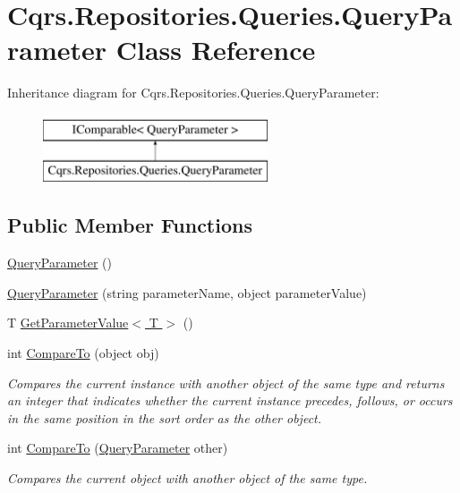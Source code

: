 \hypertarget{classCqrs_1_1Repositories_1_1Queries_1_1QueryParameter}{}\section{Cqrs.\+Repositories.\+Queries.\+Query\+Parameter Class Reference}
\label{classCqrs_1_1Repositories_1_1Queries_1_1QueryParameter}
Inheritance diagram for Cqrs.\+Repositories.\+Queries.\+Query\+Parameter\+:\begin{figure}[H]
\begin{center}
\leavevmode
\includegraphics[height=2.000000cm]{classCqrs_1_1Repositories_1_1Queries_1_1QueryParameter}
\end{center}
\end{figure}
\subsection*{Public Member Functions}
\begin{DoxyCompactItemize}
\item 
\hyperlink{classCqrs_1_1Repositories_1_1Queries_1_1QueryParameter_abf7919fe1130356255ba0b5c4b4f470a}{Query\+Parameter} ()
\item 
\hyperlink{classCqrs_1_1Repositories_1_1Queries_1_1QueryParameter_aada69debce3a88b09dfe7739ef22abb4}{Query\+Parameter} (string parameter\+Name, object parameter\+Value)
\item 
T \hyperlink{classCqrs_1_1Repositories_1_1Queries_1_1QueryParameter_a14f2f14cba8d0807bb80d7b8d2c7e59a}{Get\+Parameter\+Value$<$ T $>$} ()
\item 
int \hyperlink{classCqrs_1_1Repositories_1_1Queries_1_1QueryParameter_a59a2bda12bc0161d0ceb95eb02062d08}{Compare\+To} (object obj)
\begin{DoxyCompactList}\small\item\em Compares the current instance with another object of the same type and returns an integer that indicates whether the current instance precedes, follows, or occurs in the same position in the sort order as the other object. \end{DoxyCompactList}\item 
int \hyperlink{classCqrs_1_1Repositories_1_1Queries_1_1QueryParameter_a48fa36fe6189bb03008b7f9fa3d30267}{Compare\+To} (\hyperlink{classCqrs_1_1Repositories_1_1Queries_1_1QueryParameter}{Query\+Parameter} other)
\begin{DoxyCompactList}\small\item\em Compares the current object with another object of the same type. \end{DoxyCompactList}\end{DoxyCompactItemize}
